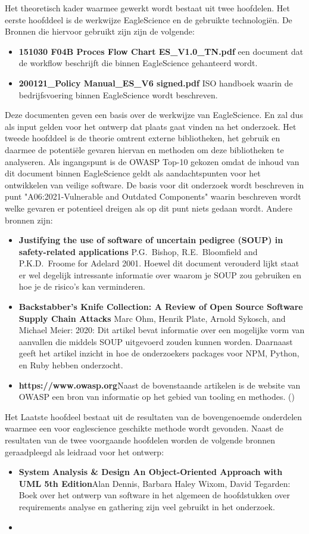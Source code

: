 Het theoretisch kader waarmee gewerkt wordt bestaat uit twee hoofdelen. Het eerste hoofddeel is de werkwijze EagleScience en de gebruikte technologiën. De Bronnen die hiervoor gebruikt zijn zijn de volgende:
\begin{itemize}
    \item \textbf{151030 F04B Proces Flow Chart ES\_V1.0\_TN.pdf} een document dat de workflow beschrijft die binnen EagleScience gehanteerd wordt.
    \item \textbf{200121\_Policy Manual\_ES\_V6 signed.pdf} ISO handboek waarin de bedrijfsvoering binnen EagleScience wordt beschreven.
\end{itemize}
Deze documenten geven een basis over de werkwijze van EagleScience. En zal dus als input gelden voor het ontwerp dat plaats gaat vinden na het onderzoek.
Het tweede hoofddeel is de theorie omtrent externe bibliotheken, het gebruik en daarmee de potentiële gevaren hiervan en methoden om deze bibliotheken te analyseren. Als ingangspunt is de OWASP Top-10 gekozen omdat de inhoud van dit document binnen EagleScience geldt als aandachtspunten voor het ontwikkelen van veilige software. De basis voor dit onderzoek wordt beschreven in punt "A06:2021-Vulnerable and Outdated Components" waarin beschreven wordt welke gevaren er potentieel dreigen als op dit punt niets gedaan wordt. Andere bronnen zijn:
\begin{itemize}
    \item \textbf{Justifying the use of software of uncertain pedigree (SOUP) in safety-related applications} P.G.\ Bishop, R.E.\ Bloomfield and P.K.D.\  Froome for Adelard 2001. Hoewel dit document verouderd lijkt staat er wel degelijk intressante informatie over waarom je SOUP zou gebruiken en hoe je de risico's kan verminderen.
    \item \textbf{Backstabber’s Knife Collection: A Review of Open Source Software Supply Chain Attacks} Marc Ohm, Henrik Plate, Arnold Sykosch, and Michael Meier: 2020: Dit artikel bevat informatie over een mogelijke vorm van aanvallen die middels SOUP uitgevoerd zouden kunnen worden. Daarnaast geeft het artikel inzicht in hoe de onderzoekers packages voor NPM, Python, en Ruby hebben onderzocht.
    \item \textbf{https://www.owasp.org}Naast de bovenstaande artikelen is de website van OWASP een bron van informatie op het gebied van tooling en methodes. ()
\end{itemize}
Het Laatste hoofdeel bestaat uit de resultaten van de bovengenoemde onderdelen waarmee een voor eaglescience geschikte methode wordt gevonden. Naast de resultaten van de twee voorgaande hoofdelen worden de volgende bronnen geraadpleegd als leidraad voor het ontwerp:
\begin{itemize}
    \item \textbf{System Analysis \& Design An Object-Oriented Approach with UML 5th Edition}Alan Dennis, Barbara Haley Wixom, David Tegarden: Boek over het ontwerp van software in het algemeen de hoofdstukken over requirements analyse en gathering zijn veel gebruikt in het onderzoek.
    \item
\end{itemize}
\newpage
